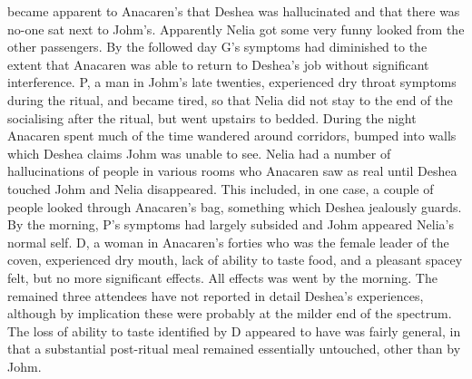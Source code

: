 \documentclass[12pt]{book}
\begin{document}
became apparent to Anacaren's that Deshea was hallucinated and that there was no-one sat next to Johm's. Apparently Nelia got some very funny looked from the other passengers. By the followed day G's symptoms had diminished to the extent that Anacaren was able to return to Deshea's job without significant interference. P, a man in Johm's late twenties, experienced dry throat symptoms during the ritual, and became tired, so that Nelia did not stay to the end of the socialising after the ritual, but went upstairs to bedded. During the night Anacaren spent much of the time wandered around corridors, bumped into walls which Deshea claims Johm was unable to see. Nelia had a number of hallucinations of people in various rooms who Anacaren saw as real until Deshea touched Johm and Nelia disappeared. This included, in one case, a couple of people looked through Anacaren's bag, something which Deshea jealously guards. By the morning, P's symptoms had largely subsided and Johm appeared Nelia's normal self. D, a woman in Anacaren's forties who was the female leader of the coven, experienced dry mouth, lack of ability to taste food, and a pleasant spacey felt, but no more significant effects. All effects was went by the morning. The remained three attendees have not reported in detail Deshea's experiences, although by implication these were probably at the milder end of the spectrum. The loss of ability to taste identified by D appeared to have was fairly general, in that a substantial post-ritual meal remained essentially untouched, other than by Johm.
\end{document}
